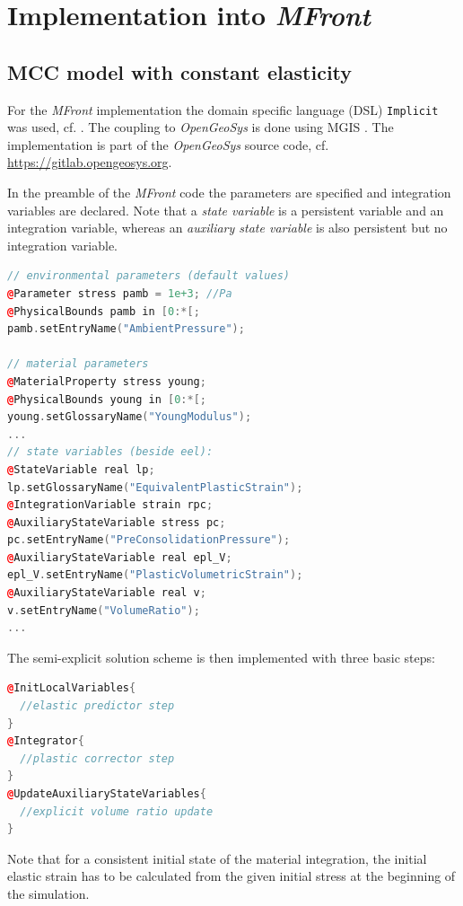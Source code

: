 \documentclass[paper=a4, twoside, pagesize]{scrartcl}
\begin{document}
\section{Implementation into \textsl{MFront}}

\subsection{MCC model with constant elasticity}\label{subsec:ImplementationConstE}

For the \textsl{MFront} implementation the domain specific language (DSL) \texttt{Implicit} was used, cf. \cite{Helfer2015,Marois2020}. The coupling to \textsl{OpenGeoSys} \cite{Kolditz2012a,Bilke2019} is done using MGIS \cite{Helfer2020}. The implementation is part of the \textsl{OpenGeoSys} source code, cf. \url{https://gitlab.opengeosys.org}.

In the preamble of the \textsl{MFront} code the parameters are specified and integration variables are declared. Note that a \emph{state variable} is a persistent variable and an integration variable, whereas an \emph{auxiliary state variable} is also persistent but no integration variable.
\begin{lstlisting}[language={C++}]
// environmental parameters (default values)
@Parameter stress pamb = 1e+3; //Pa
@PhysicalBounds pamb in [0:*[;
pamb.setEntryName("AmbientPressure");

// material parameters
@MaterialProperty stress young;
@PhysicalBounds young in [0:*[;
young.setGlossaryName("YoungModulus");
...
// state variables (beside eel):
@StateVariable real lp;
lp.setGlossaryName("EquivalentPlasticStrain");
@IntegrationVariable strain rpc;
@AuxiliaryStateVariable stress pc;
pc.setEntryName("PreConsolidationPressure");
@AuxiliaryStateVariable real epl_V;
epl_V.setEntryName("PlasticVolumetricStrain");
@AuxiliaryStateVariable real v;
v.setEntryName("VolumeRatio");  
...
\end{lstlisting}
%
The semi-explicit solution scheme is then implemented with three basic steps:
\begin{lstlisting}[language={C++}]
@InitLocalVariables{
  //elastic predictor step
}
@Integrator{
  //plastic corrector step
}
@UpdateAuxiliaryStateVariables{
  //explicit volume ratio update
}
\end{lstlisting}

Note that for a consistent initial state of the material integration, the initial elastic strain has to be calculated from the given initial stress at the beginning of the simulation.
\end{document}
